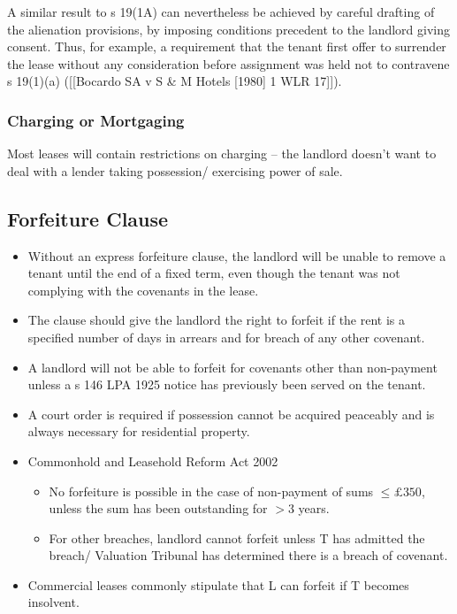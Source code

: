 \documentclass[
]{article}
\providecommand{\tightlist}{%
  \setlength{\itemsep}{0pt}\setlength{\parskip}{0pt}}
\begin{document}
A similar result to s 19(1A) can nevertheless be achieved by careful
drafting of the alienation provisions, by imposing conditions precedent
to the landlord giving consent. Thus, for example, a requirement that
the tenant first offer to surrender the lease without any consideration
before assignment was held not to contravene s 19(1)(a) ({[}{[}Bocardo
SA v S \& M Hotels {[}1980{]} 1 WLR 17{]}{]}).

\hypertarget{charging-or-mortgaging}{%
\subsubsection{Charging or Mortgaging}\label{charging-or-mortgaging}}

Most leases will contain restrictions on charging -- the landlord
doesn't want to deal with a lender taking possession/ exercising power
of sale.

\hypertarget{forfeiture-clause}{%
\subsection{Forfeiture Clause}\label{forfeiture-clause}}

\begin{itemize}
\tightlist
\item
  Without an express forfeiture clause, the landlord will be unable to
  remove a tenant until the end of a fixed term, even though the tenant
  was not complying with the covenants in the lease.
\item
  The clause should give the landlord the right to forfeit if the rent
  is a specified number of days in arrears and for breach of any other
  covenant.
\item
  A landlord will not be able to forfeit for covenants other than
  non-payment unless a s 146 LPA 1925 notice has previously been served
  on the tenant.
\item
  A court order is required if possession cannot be acquired peaceably
  and is always necessary for residential property.
\item
  Commonhold and Leasehold Reform Act 2002

  \begin{itemize}
  \tightlist
  \item
    No forfeiture is possible in the case of non-payment of sums
    \(\leq £350\), unless the sum has been outstanding for \(>3\) years.
  \item
    For other breaches, landlord cannot forfeit unless T has admitted
    the breach/ Valuation Tribunal has determined there is a breach of
    covenant.
  \end{itemize}
\item
  Commercial leases commonly stipulate that L can forfeit if T becomes
  insolvent.
\end{itemize}
\end{document}
